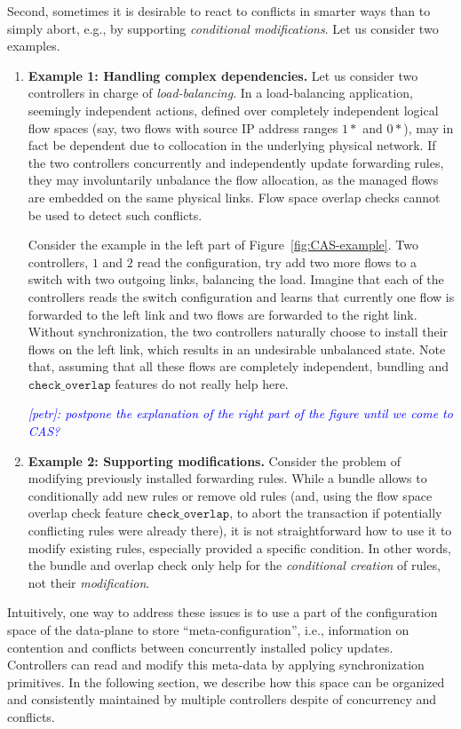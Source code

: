 \documentclass[conference]{sigcomm-alternate}
\newcommand{\checko}{\texttt{check\_overlap}\xspace}
\newcommand{\petr}[1]{\textit{\textcolor{blue}{[petr]: #1}}} %
\begin{document}
Second, sometimes it is desirable to react to conflicts in smarter ways than
 to simply abort, e.g., by supporting \emph{conditional modifications}.
Let us consider two examples.

\begin{enumerate}
\item \textbf{Example 1: Handling complex dependencies.} Let us consider two controllers
in charge
of \emph{load-balancing}.
In a load-balancing application, seemingly independent actions, defined over
completely independent logical flow spaces (say, two flows with source IP address ranges $1*$ and $0*$),
may in fact be dependent due to collocation in the underlying physical network.
If the two controllers concurrently and independently
update forwarding rules,
they may involuntarily
unbalance the flow allocation, as the managed flows are embedded
on the same physical links.
Flow space overlap checks cannot be used to detect
such conflicts.

Consider the example in the left part of Figure~\ref{fig:CAS-example}. Two controllers,
$1$ and $2$ read the configuration, try add two more flows to a switch
with two outgoing links, balancing the load.  
Imagine that each of the controllers reads the switch configuration and
learns that currently one flow is forwarded to the left link and two
flows are forwarded to the right link.
Without synchronization, the two controllers naturally choose to
install their flows on the left link, which results in an undesirable
unbalanced state. Note that, assuming that all these flows are
completely independent, bundling and $\checko$ features do not really
help here.  

\petr{postpone the explanation of the right part of the figure until we come to CAS?} 

\item \textbf{Example 2: Supporting modifications.} 
Consider the problem of modifying previously installed forwarding rules.
While a bundle allows to conditionally add new rules or remove
old rules (and, using the flow space overlap
check feature $\checko$, to abort the transaction if potentially conflicting
rules were already there), it is not straightforward how to use it to  
modify existing rules, especially provided a specific condition.
In other words, the bundle and overlap check only help
for the \emph{conditional creation} of rules, not their \emph{modification}.
\end{enumerate}


Intuitively, one way to address these issues is to use a part of the
configuration space of the data-plane to store 
``meta-configuration'', i.e., information on contention and conflicts between
concurrently installed policy updates. Controllers can read and modify
this meta-data by applying synchronization primitives. 
In the following section, we
describe how this space can be organized and consistently maintained
by multiple controllers despite of concurrency and conflicts.    
\end{document}
